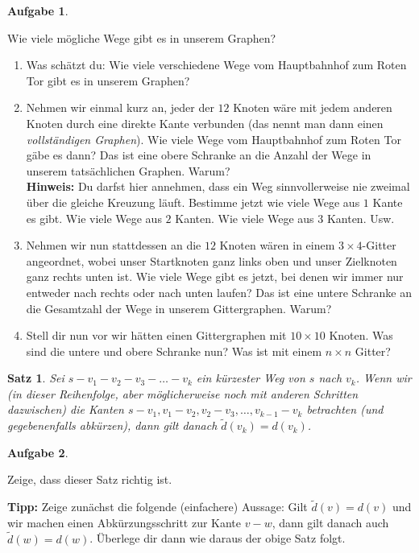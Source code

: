 \documentclass[a4paper,ngerman,12pt]{scrartcl}
\theoremstyle{definition}
\newtheorem{aufg}{Aufgabe}
\newenvironment{aufgabe}[1][]
		{\begin{shaded}\vspace{-0.3cm}\begin{aufg}\emph{#1} \par\medskip}
		{\end{aufg}\vspace{-0.3cm}\end{shaded}}
\theoremstyle{plain}
\newtheorem{satz}[defn]{Satz}
\theoremstyle{remark}
\newcommand{\kante}[2]{#1{-}#2}
\begin{document}
\begin{aufgabe}\label{aufg:WegeZahlen}
	Wie viele mögliche Wege gibt es in unserem Graphen?
	\begin{enumerate}[label=\alph*)]
		\item Was schätzt du: Wie viele verschiedene Wege vom Hauptbahnhof zum Roten Tor gibt es in unserem Graphen?
		\item Nehmen wir einmal kurz an, jeder der $12$ Knoten wäre mit jedem anderen Knoten durch eine direkte Kante verbunden (das nennt man dann einen \emph{vollständigen Graphen}). Wie viele Wege vom Hauptbahnhof zum Roten Tor gäbe es dann? Das ist eine obere Schranke an die Anzahl der Wege in unserem tatsächlichen Graphen. Warum?\\
		\textbf{Hinweis:} Du darfst hier annehmen, dass ein Weg sinnvollerweise nie zweimal über die gleiche Kreuzung läuft. Bestimme jetzt wie viele Wege aus $1$ Kante es gibt. Wie viele Wege aus $2$ Kanten. Wie viele Wege aus $3$ Kanten. Usw.
		\item Nehmen wir nun stattdessen an die $12$ Knoten wären in einem $3\times 4$-Gitter angeordnet, wobei unser Startknoten ganz links oben und unser Zielknoten ganz rechts unten ist. Wie viele Wege gibt es jetzt, bei denen wir immer nur entweder nach rechts oder nach unten laufen? Das ist eine untere Schranke an die Gesamtzahl der Wege in unserem Gittergraphen. Warum?
		\item Stell dir nun vor wir hätten einen Gittergraphen mit $10\times 10$ Knoten. Was sind die untere und obere Schranke nun? Was ist mit einem $n \times n$ Gitter?
	\end{enumerate}
\end{aufgabe}

\begin{satz}
	Sei $s{-}v_1{-}v_2{-}v_3{-}\dots{-}v_k$ ein kürzester Weg von $s$ nach $v_k$. Wenn wir (in dieser Reihenfolge, aber möglicherweise noch mit anderen Schritten dazwischen) die Kanten $\kante{s}{v_1}, \kante{v_1}{v_2}, \kante{v_2}{v_3}, \dots, \kante{v_{k-1}}{v_k}$ betrachten (und gegebenenfalls abkürzen), dann gilt danach $\tilde{d}(v_k) = d(v_k)$.
\end{satz}

\begin{aufgabe}
	Zeige, dass dieser Satz richtig ist.
	
	\textbf{Tipp:} Zeige zunächst die folgende (einfachere) Aussage: Gilt $\tilde{d}(v) = d(v)$ und wir machen einen Abkürzungsschritt zur Kante $\kante{v}{w}$, dann gilt danach auch $\tilde{d}(w) = d(w)$. Überlege dir dann wie daraus der obige Satz folgt.
\end{aufgabe}
\end{document}
